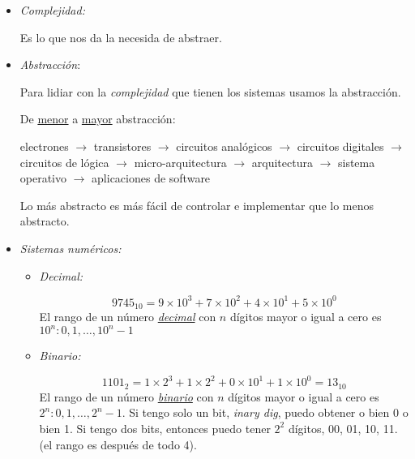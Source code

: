 \begin{itemize}[label=\iconTeoriaUno]
  \item  \textit{Complejidad:}\par
        Es lo que nos da la necesida de abstraer.

  \item \textit{Abstracción}: \par
        Para lidiar con la \textit{complejidad} que tienen los sistemas usamos la abstracción.\par
        De \underline{menor} a \underline{mayor} abstracción:
        \begin{center}
          electrones
          $\to$
          transistores
          $\to$
          circuitos analógicos
          $\to$
          circuitos digitales
          $\to$
          circuitos de lógica
          $\to$
          micro-arquitectura
          $\to$
          arquitectura
          $\to$
          sistema operativo
          $\to$
          aplicaciones de software
        \end{center}

        Lo más abstracto es más fácil de controlar e implementar que lo menos abstracto.

  \item \textit{Sistemas numéricos:}
        \begin{itemize}[label=\iconTeoriaDos]
          \item \textit{Decimal:}\par
                $$
                  9745_{10} = 9 \times 10^3 + 7 \times 10^2 + 4 \times 10^1 + 5 \times 10^0
                $$
                El rango de un número \underline{\textit{decimal}} con $n$ dígitos mayor o igual a cero es $10^n: 0,1, \dots, 10^{n} - 1$

          \item \textit{Binario:}\par
                $$
                  1101_2 = 1 \times 2^3 + 1 \times 2^2 + 0 \times 10^1 + 1 \times 10^0
                  = 13_{10}
                $$
                El rango de un número \underline{\textit{binario}} con $n$ dígitos mayor o igual a cero es $2^n: 0,1, \dots, 2^{n} - 1$.
                Si tengo solo un bit, \textit{inary dig}, puedo obtener o bien 0 o bien 1. Si tengo dos bits, entonces
                puedo tener $2^2$ dígitos, 00, 01, 10, 11. (el rango es después de todo 4).


\end{itemize}
\end{itemize}
